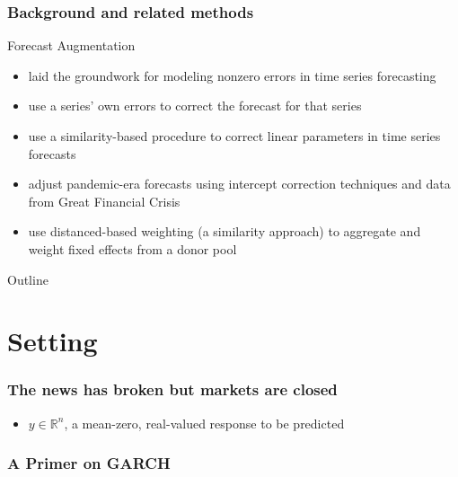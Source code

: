 \documentclass{beamer}
\begin{document}
\begin{frame}
    \frametitle{Background and related methods}

    Forecast Augmentation
    \begin{itemize}
        \item \cite[][]{clements1996intercept,clements1998forecasting} laid the groundwork for modeling nonzero errors in time series forecasting
        \item \cite[][]{guerron2017macroeconomic} use a series' own errors to correct the forecast for that series
        \item \cite[][]{dendramis2020similarity} use a similarity-based procedure to correct linear parameters in time series forecasts
        \item \cite[][]{foroni2022forecasting} adjust pandemic-era forecasts using intercept correction techniques and data from Great Financial Crisis
        \item \cite[][]{lin2021minimizing} use distanced-based weighting (a similarity approach) to aggregate and weight fixed effects from a donor pool
    \end{itemize}
\end{frame}
\begin{frame}{Outline}
    \tableofcontents
\end{frame}

\section{Setting}

\begin{frame}
\frametitle{The news has broken but markets are closed}

\begin{itemize}
\item $y\in \mathbb{R}^{n}$, a mean-zero, real-valued response to be predicted

\end{itemize}
\end{frame}

\begin{frame}
    \frametitle{A Primer on GARCH}
\end{frame}
\end{document}
